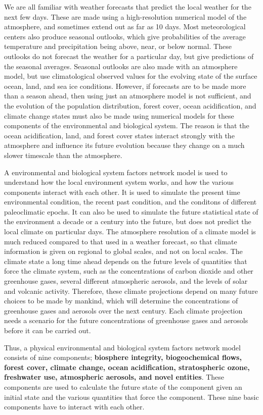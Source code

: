 \documentclass[a4paper,11pt]{article}
\begin{document}
\par We are all familiar with weather forecasts that predict the local weather for the next few days. These are made using a high-resolution numerical model of the atmosphere, and sometimes extend out as far as 10 days. Most meteorological centers also produce seasonal outlooks, which give probabilities of the average temperature and precipitation being above, near, or below normal. These outlooks do not forecast the weather for a particular day, but give predictions of the seasonal averages. Seasonal outlooks are also made with an atmosphere model, but use climatological observed values for the evolving state of the surface ocean, land, and sea ice conditions. However, if forecasts are to be made more than a season ahead, then using just an atmosphere model is not sufficient, and the evolution of the population distribution, forest cover, ocean acidification, and climate change states must also be made using numerical models for these components of the environmental and biological system. The reason is that the ocean acidification, land, and forest cover states interact strongly with the atmosphere and influence its future evolution because they change on a much slower timescale than the atmosphere.
\par A environmental and biological system factors network model is used to understand how the local environment system works, and how the various components interact with each other. It is used to simulate the present time environmental condition, the recent past condition, and the conditons of different paleoclimatic epochs. It can also be used to simulate the future statistical state of the environment a decade or a century into the future, but does not predict the local climate on particular days. The atmosphere resolution of a climate model is much reduced compared to that used in a weather forecast, so that climate information is given on regional to global scales, and not on local scales. The climate state a long time ahead depends on the future levels of quantities that force the climate system, such as the concentrations of carbon dioxide and other greenhouse gases, several different atmospheric aerosols, and the levels of solar and volcanic activity. Therefore, these climate projections depend on many future choices to be made by mankind, which will determine the concentrations of greenhouse gases and aerosols over the next century. Each climate projection needs a scenario for the future concentrations of greenhouse gases and aerosols before it can be carried out.
\par Thus, a physical environmental and biological system factors network model consists of nine components; \textbf{biosphere integrity, biogeochemical flows, forest cover, climate change, ocean acidification, stratospheric ozone, freshwater use, atmospheric aerosols, and novel entities}. These components are used to calculate the future state of the component given an initial state and the various quantities that force the component. These nine basic components have to interact with each other.
\end{document}

